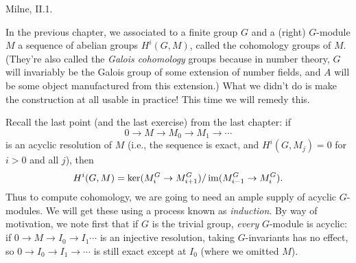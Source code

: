 %
%
%
%
%
%
%

 Milne, II.1.

\medskip
In the previous chapter, we associated to a finite group $G$ and a (right) $G$-module
$M$ a sequence of abelian groups $H^i(G, M)$, called the cohomology
groups of $M$. (They're also called the \emph{Galois cohomology} groups because in
number theory, $G$ will invariably be the Galois group of some extension
of number fields, and $A$ will be some object manufactured from this
extension.) What we didn't do is make the construction at all usable in
practice! This time we will remedy this.

Recall the last point (and the last exercise) from the last chapter: if 
\[
0 \to M \to M_0 \to M_1 \to \cdots
\]
is an acyclic resolution of $M$ (i.e., the sequence is exact, and 
$H^i(G, M_j) = 0$ for $i > 0$ and all $j$), then
\[
H^i(G, M) = \ker(M_i^G \to M_{i+1}^G)/\operatorname{im}(M_{i-1}^G \to M_i^G).
\]
Thus to compute cohomology, we are going to need an ample supply of
acyclic $G$-modules. We will get these using a process known as \emph{induction}.
By way of motivation, we note first that if $G$ is the trivial group, 
\emph{every} $G$-module is acyclic: if $0 \to M \to I_0 \to I_1 \cdots$ is
an injective resolution, taking $G$-invariants has no effect, so
$0 \to I_0 \to I_1 \to \cdots$ is still exact except at $I_0$
(where we omitted $M$).

